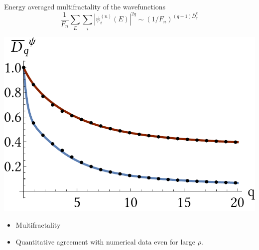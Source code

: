 \documentclass[xcolor=x11names,compress,professionalfonts]{beamer}
\renewcommand{\(}{\begin{columns}}
\renewcommand{\)}{\end{columns}}
\newcommand{\<}[1]{\begin{column}{#1}}
\renewcommand{\>}{\end{column}}
\begin{document}
\begin{frame}{Energy averaged multifractality of the wavefunctions}
\[ 
	\frac{1}{F_n} \sum_E \sum_i |\psi_i^{(n)}(E)|^{2q}  \sim (1/F_n)^{(q-1)\bar{D}_q^\psi}
\]

{
\centering

		\includegraphics[scale=.55]{dq_av.pdf}		
		
}

		\begin{itemize}
			\item Multifractality
			\item Quantitative agreement with numerical data even for large $\rho$.
		\end{itemize}

\end{frame}
\end{document}

